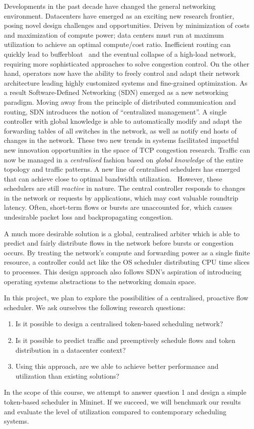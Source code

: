 Developments in the past decade have changed the general networking environment. Datacenters have emerged as an exciting new research frontier, posing novel  design challenges and opportunities.
Driven by minimization of costs and maximization of compute power;  data centers must  run at maximum utilization to achieve an optimal compute/cost ratio. Inefficient routing can quickly lead to bufferbloat~\cite{bufferbloat} and the eventual collapse of a high-load network, requiring more sophisticated approaches to solve congestion control. 
On the other hand, operators now have the ability to freely control and adapt their network architecture leading highly customized systems and fine-grained optimization. As a result  Software-Defined Networking (SDN) emerged as a new networking paradigm. Moving away from the principle of distributed communication and routing, SDN introduces the notion of “centralized management”. A single controller with global knowledge is able to automatically modify and adapt the forwarding tables of all switches in the network, as well as notify end hosts of changes in the network.
These two new trends in systems facilitated impactful new innovation opportunities in the space of TCP congestion research. Traffic can now be managed in a  \textit{centralised} fashion based on \textit{global knowledge} of the entire topology and traffic patterns.
A new line of centralised schedulers has emerged that  can achieve close to optimal bandwidth utilization.~\cite{hedera, fastpass, microte, b4, dionysus}
However, these schedulers are still  \textit{reactive}  in nature. The central controller responds to changes in the network or requests by applications, which may cost valuable roundtrip latency. Often, short-term flows or bursts are unaccounted for, which causes undesirable packet loss and backpropagating congestion. 

A much more desirable solution is a global, centralised arbiter which is able to predict and fairly distribute flows in the network before bursts or congestion occurs. By treating the network’s compute and forwarding power as a single finite resource, a controller could act like the OS scheduler distributing CPU time slices to processes. This design approach also follows SDN’s aspiration of introducing operating systems abstractions to the networking domain space.



In this project, we plan to explore the possibilities of a centralised, proactive flow scheduler. We ask ourselves the following research questions:
\begin{enumerate}
\item Is it possible to design a centralised token-based scheduling network?
\item Is it possible to predict traffic and preemptively schedule flows and token distribution in a datacenter context?
\item Using this approach, are we able to achieve better performance and utilization than existing solutions?
\end{enumerate}

In the scope of this course, we attempt to answer question 1 and design a simple token-based scheduler in Mininet. If we succeed, we will benchmark our results and evaluate the level of utilization compared to contemporary scheduling systems.


